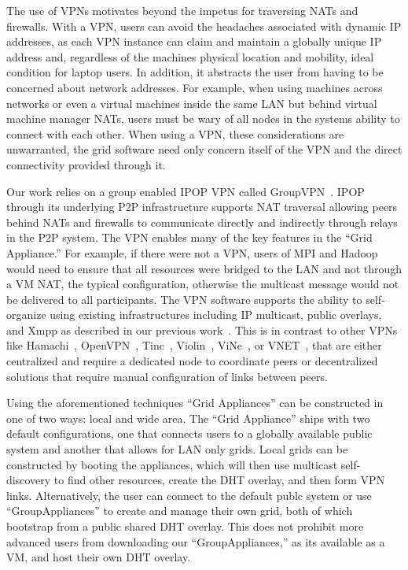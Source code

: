\documentclass[conference]{IEEEtran}
\begin{document}
The use of VPNs motivates beyond the impetus for traversing NATs and firewalls.
With a VPN, users can avoid the headaches associated with dynamic IP addresses,
as each VPN instance can claim and maintain a globally unique IP address and,
regardless of the machines physical location and mobility, ideal condition for
laptop users.  In addition, it abstracts the user from having to be concerned
about network addresses.  For example, when using machines across networks or
even a virtual machines inside the same LAN but behind virtual machine manager
NATs, users must be wary of all nodes in the systems ability to connect with
each other.  When using a VPN, these considerations are unwarranted, the grid
software need only concern itself of the VPN and the direct connectivity
provided through it.

Our work relies on a group enabled IPOP VPN called GroupVPN~\cite{groupvpn}.
IPOP through its underlying P2P infrastructure supports NAT traversal allowing
peers behind NATs and firewalls to communicate directly and indirectly through
relays in the P2P system.  The VPN enables many of the key features in the
``Grid Appliance.'' For example, if there were not a VPN, users of MPI and
Hadoop would need to ensure that all resources were bridged to the LAN and not
through a VM NAT, the typical configuration, otherwise the multicast message
would not be delivered to all participants.  The VPN software supports the
ability to self-organize using existing infrastructures including IP multicast,
public overlays, and Xmpp as described in our previous
work~\cite{bootstrapping}.  This is in contrast to other VPNs like
Hamachi~\cite{hamachi}, OpenVPN~\cite{openvpn}, Tinc~\cite{tinc},
Violin~\cite{violin}, ViNe~\cite{vine}, or VNET~\cite{vnet}, that are either
centralized and require a dedicated node to coordinate peers or decentralized
solutions that require manual configuration of links between peers.

Using the aforementioned techniques ``Grid Appliances'' can be constructed in
one of two ways: local and wide area.  The ``Grid Appliance'' ships with two
default configurations, one that connects users to a globally available public
system and another that allows for LAN only grids.  Local grids can be
constructed by booting the appliances, which will then use multicast
self-discovery to find other resources, create the DHT overlay, and then form
VPN links.  Alternatively, the user can connect to the default publc system or
use ``GroupAppliances'' to create and manage their own grid, both of which
bootstrap from a public shared DHT overlay.  This does not prohibit more
advanced users from downloading our ``GroupAppliances,'' as its available as a
VM, and host their own DHT overlay.
\end{document}
